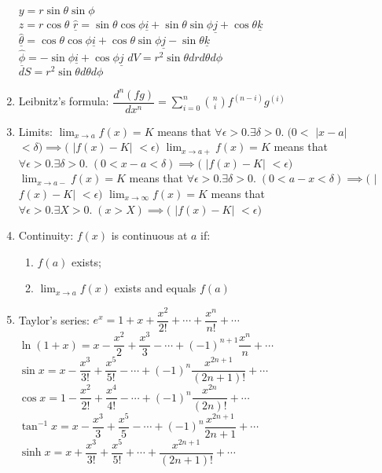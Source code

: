 \documentclass[fleqn]{article}
\begin{document}
\begin{enumerate}
        $y=r\sin\theta\sin\phi$\\
        $z=r\cos\theta$\smallbreak
        $\underline{\hat{r}}=\sin\theta\cos\phi\underline{i}+\sin\theta\sin\phi\underline{j}+\cos\theta\underline{k}$\\
        $\underline{\hat{\theta}}=\cos\theta\cos\phi\underline{i}+\cos\theta\sin\phi\underline{j}-\sin\theta\underline{k}$\\
        $\underline{\hat{\phi}}=-\sin\phi\underline{i}+\cos\phi\underline{j}$\smallbreak
        $dV=r^2\sin\theta dr d\theta d\phi$\\
        $dS=r^2\sin\theta d\theta d\phi$
    \item Leibnitz's formula:\smallbreak
        $\dfrac{d^n(fg)}{dx^n}=\displaystyle\sum_{i=0}^{n}\binom{n}{i}f^{(n-i)}g^{(i)}$
    \item Limits: \smallbreak
        $\displaystyle\lim_{x\to a}f(x)=K$ means that
        $\forall\epsilon>0.\exists\delta>0.\;(0<$ $|$$x-a$$|$ $<\delta)\implies($ $|$$f(x)-K$$|$ $<\epsilon)$\smallbreak
        $\displaystyle\lim_{x\to a+}f(x)=K$ means that
        $\forall\epsilon>0.\exists\delta>0.\;(0<x-a<\delta)\implies($ $|$$f(x)-K$$|$ $<\epsilon)$\smallbreak
        $\displaystyle\lim_{x\to a-}f(x)=K$ means that
        $\forall\epsilon>0.\exists\delta>0.\;(0<a-x<\delta)\implies($ $|$$f(x)-K$$|$ $<\epsilon)$\smallbreak
        $\displaystyle\lim_{x\to\infty}f(x)=K$ means that
        $\forall\epsilon>0.\exists X>0.\;(x>X)\implies($ $|$$f(x)-K$$|$ $<\epsilon)$
    \item Continuity: $f(x)$ is continuous at $a$ if:
        \begin{enumerate}[1)]
            \item $f(a)$ exists;
            \item $\displaystyle\lim_{x\to a}f(x)$ exists and equals $f(a)$
        \end{enumerate}
    \newpage
    \item Taylor's series:\smallbreak
        $e^x=1+x+\dfrac{x^2}{2!}+\cdots+\dfrac{x^n}{n!}+\cdots$\smallbreak
        $\ln(1+x)=x-\dfrac{x^2}{2}+\dfrac{x^3}{3}-\cdots+(-1)^{n+1}\dfrac{x^n}{n}+\cdots$\smallbreak
        $\sin x=x-\dfrac{x^3}{3!}+\dfrac{x^5}{5!}-\cdots+(-1)^n\dfrac{x^{2n+1}}{(2n+1)!}+\cdots$\smallbreak
        $\cos x=1-\dfrac{x^2}{2!}+\dfrac{x^4}{4!}-\cdots+(-1)^n\dfrac{x^{2n}}{(2n)!}+\cdots$\smallbreak
        $\tan^{-1}x=x-\dfrac{x^3}{3}+\dfrac{x^5}{5}-\cdots+(-1)^n\dfrac{x^{2n+1}}{2n+1}+\cdots$\smallbreak
        $\sinh x=x+\dfrac{x^3}{3!}+\dfrac{x^5}{5!}+\cdots+\dfrac{x^{2n+1}}{(2n+1)!}+\cdots$\smallbreak

\end{enumerate}
\end{document}

